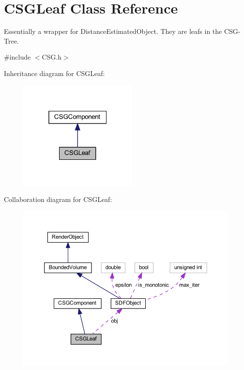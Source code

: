 \hypertarget{classCSGLeaf}{}\section{C\+S\+G\+Leaf Class Reference}
\label{classCSGLeaf}


Essentially a wrapper for Distance\+Estimated\+Object. They are leafs in the C\+S\+G-\/\+Tree.  




{\ttfamily \#include $<$C\+S\+G.\+h$>$}



Inheritance diagram for C\+S\+G\+Leaf\+:
\nopagebreak
\begin{figure}[H]
\begin{center}
\leavevmode
\includegraphics[width=169pt]{classCSGLeaf__inherit__graph}
\end{center}
\end{figure}


Collaboration diagram for C\+S\+G\+Leaf\+:
\nopagebreak
\begin{figure}[H]
\begin{center}
\leavevmode
\includegraphics[width=350pt]{classCSGLeaf__coll__graph}
\end{center}
\end{figure}
